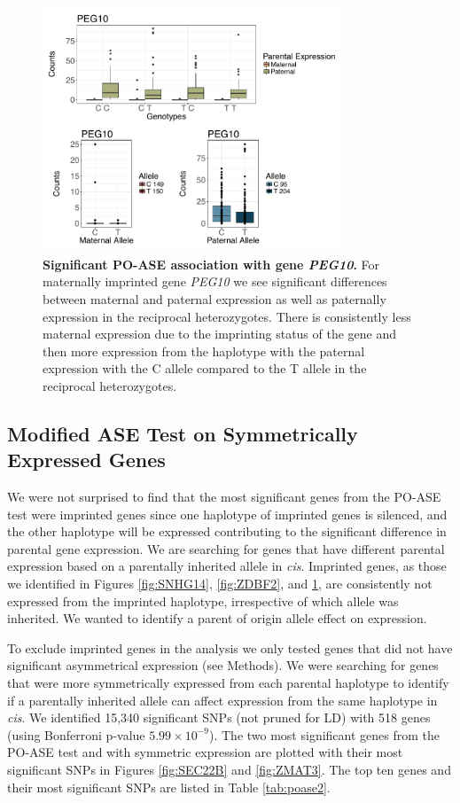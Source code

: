 \begin{figure}[!htb]
\centering \includegraphics[width=3.5in]{img/ch04/PEG10.pdf}
\caption[Significant PO-ASE association with gene \emph{PEG10}.]{\textbf{Significant PO-ASE association with gene \emph{PEG10}.} For maternally imprinted gene \emph{PEG10} we see significant differences between maternal and paternal expression as well as paternally expression in the reciprocal heterozygotes. There is consistently less maternal expression due to the imprinting status of the gene and then more expression from the haplotype with the paternal expression with the C allele compared to the T allele in the reciprocal heterozygotes.}
\label{fig:PEG10}
\end{figure}


\subsection{Modified ASE Test on Symmetrically Expressed Genes}\label{Modified ASE Test on Symmetrically Expressed Genes} 
We were not surprised to find that the most significant genes from the PO-ASE test were imprinted genes since one haplotype of imprinted genes is silenced, and the other haplotype will be expressed contributing to the significant difference in parental gene expression. We are searching for genes that have different parental expression based on a parentally inherited allele in \emph{cis}. Imprinted genes, as those we identified in Figures \ref{fig:SNHG14}, \ref{fig:ZDBF2}, and \ref{fig:PEG10}, are consistently not expressed from the imprinted haplotype, irrespective of which allele was inherited. We wanted to identify a parent of origin allele effect on expression.
 
To exclude imprinted genes in the analysis we only tested genes that did not have significant asymmetrical expression (see Methods). We were searching for genes that were more symmetrically expressed from each parental haplotype to identify if a parentally inherited allele can affect expression from the same haplotype in \emph{cis}. We identified 15,340 significant SNPs (not pruned for LD) with 518 genes (using Bonferroni p-value $5.99 \times 10^{-9} $). The two most significant genes from the PO-ASE test and with symmetric expression are plotted with their most significant SNPs in Figures \ref{fig:SEC22B} and \ref{fig:ZMAT3}. The top ten genes and their most significant SNPs are listed in Table \ref{tab:poase2}.


